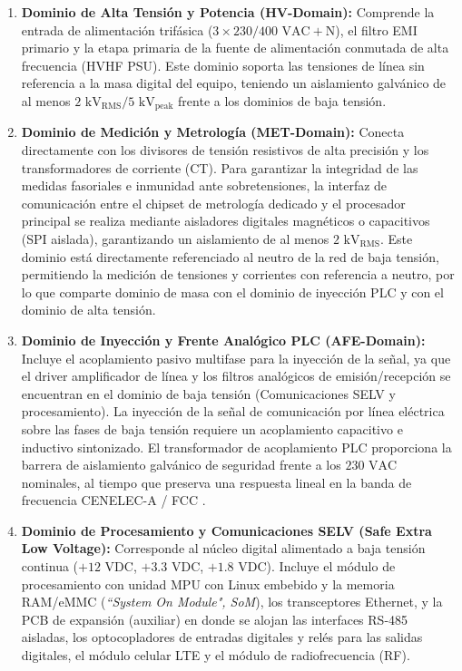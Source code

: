 \begin{enumerate}
    \item \textbf{Dominio de Alta Tensión y Potencia (HV-Domain):} Comprende la entrada de alimentación trifásica ($3\times230/400\text{ VAC} + \text{N}$), el filtro EMI primario y la etapa primaria de la fuente de alimentación conmutada de alta frecuencia (HVHF PSU). Este dominio soporta las tensiones de línea sin referencia a la masa digital del equipo, teniendo un aislamiento galvánico de al menos $2\text{ kV}_{\text{RMS}}/5\text{ kV}_{\text{peak}}$ frente a los dominios de baja tensión.
    \item \textbf{Dominio de Medición y Metrología (MET-Domain):} Conecta directamente con los divisores de tensión resistivos de alta precisión y los transformadores de corriente (CT). Para garantizar la integridad de las medidas fasoriales e inmunidad ante sobretensiones, la interfaz de comunicación entre el chipset de metrología dedicado y el procesador principal se realiza mediante aisladores digitales magnéticos o capacitivos (SPI aislada), garantizando un aislamiento de al menos $2\text{ kV}_{\text{RMS}}$. Este dominio está directamente referenciado al neutro de la red de baja tensión, permitiendo la medición de tensiones y corrientes con referencia a neutro, por lo que comparte dominio de masa con el dominio de inyección PLC y con el dominio de alta tensión.
    \item \textbf{Dominio de Inyección y Frente Analógico PLC (AFE-Domain):} Incluye el acoplamiento pasivo multifase para la inyección de la señal, ya que el driver amplificador de línea y los filtros analógicos de emisión/recepción se encuentran en el dominio de baja tensión (Comunicaciones SELV y procesamiento). La inyección de la señal de comunicación por línea eléctrica sobre las fases de baja tensión requiere un acoplamiento capacitivo e inductivo sintonizado. El transformador de acoplamiento PLC proporciona la barrera de aislamiento galvánico de seguridad frente a los $230\text{ VAC}$ nominales, al tiempo que preserva una respuesta lineal en la banda de frecuencia CENELEC-A / FCC \cite{6525864}.
    \item \textbf{Dominio de Procesamiento y Comunicaciones SELV (Safe Extra Low Voltage):} Corresponde al núcleo digital alimentado a baja tensión continua ($+12\text{ VDC}$, $+3.3\text{ VDC}$, $+1.8\text{ VDC}$). Incluye el módulo de procesamiento con unidad MPU con Linux embebido y la memoria RAM/eMMC (\textit{``System On Module", SoM}), los transceptores Ethernet, y la PCB de expansión (auxiliar) en donde se alojan las interfaces RS-485 aisladas, los optocopladores de entradas digitales y relés para las salidas digitales, el módulo celular LTE y el módulo de radiofrecuencia (RF).
\end{enumerate}

